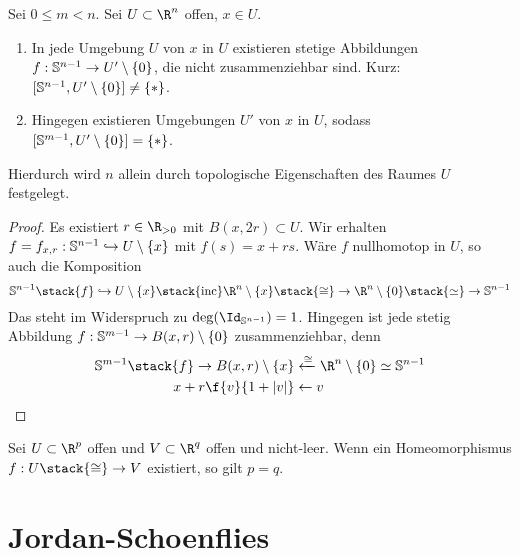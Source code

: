 \begin{st}
	Sei $0 \le m < n$.
	Sei $U \subset \R^n$ offen, $x \in U$.
	\begin{enumerate}[(1)]
		\item
			In jede Umgebung $U$ von $x$ in $U$ existieren stetige Abbildungen $f: \S^{n-1} \to U' \setminus \{0\}$, die nicht zusammenziehbar sind.
			Kurz: $[\S^{n-1}, U' \setminus \{0\}] \neq \{*\}$.
		\item
			Hingegen existieren Umgebungen $U'$ von $x$ in $U$, sodass $[\S^{m-1}, U' \setminus \{0\}] = \{*\}$.
	\end{enumerate}
	Hierdurch wird $n$ allein durch topologische Eigenschaften des Raumes $U$ festgelegt.
	\begin{proof}
		Es existiert $r \in \R_{>0}$ mit $B(x, 2r) \subset U$.
		Wir erhalten $f = f_{x,r} : \S^{n-1} \injto U \setminus \{x\}$ mit $f(s) = x + rs$.
		Wäre $f$ nullhomotop in $U$, so auch die Komposition
		\[
			\S^{n-1} \stack{f}\injto U \setminus \{x\} \stack{\mathrm{inc}} \R^n \setminus \{x\} \stack{\homeomorphic}\to \R^n \setminus \{0\} \stack{\homotopic}\to \S^{n-1}
		\]
		Das steht im Widerspruch zu $\deg(\Id_{\S^{n-1}}) = 1$.
		Hingegen ist jede stetig Abbildung $f: \S^{m-1} \to B(x, r) \setminus \{0\}$ zusammenziehbar, denn
		\begin{align*}
			\S^{m-1} \stack{f}\to B(x,r) \setminus \{x\} & \xleftarrow{\homeomorphic} \R^n \setminus \{0\} \homotopic \S^{n-1} \\
			x + r \f {v}{1+|v|} & \leftarrow v
		\end{align*}
	\end{proof}
\end{st}

\begin{st}
	Sei $U \subset \R^p$ offen und $V \subset \R^q$ offen und nicht-leer.
	Wenn ein Homeomorphismus $f: U \stack{\homeomorphic}\to V$ existiert, so gilt $p = q$.
\end{st}


\section{Jordan-Schoenflies}

